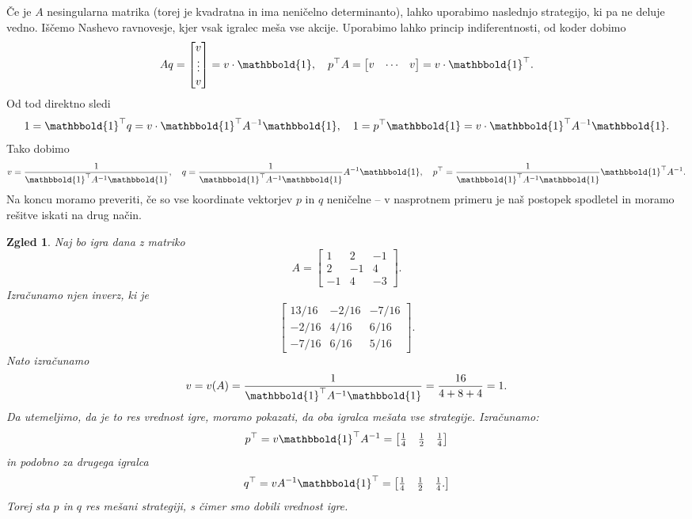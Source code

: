 \documentclass[10pt, a4paper]{article}
\newtheorem{zgled}[izr]{Zgled}
\begin{document}
Če je $A$ nesingularna matrika (torej je kvadratna in ima neničelno determinanto), lahko uporabimo naslednjo strategijo, ki pa ne deluje vedno.
Iščemo Nashevo ravnovesje, kjer vsak igralec meša vse akcije. Uporabimo lahko princip indiferentnosti, od koder dobimo 
$$A q = \begin{bmatrix}
  v \\ \vdots \\ v
\end{bmatrix} = v \cdot \mathbbold{1},\quad p ^\top A = \begin{bmatrix}
  v & \cdots & v
\end{bmatrix} = v \cdot \mathbbold{1}^\top.$$
Od tod direktno sledi 
$$1 = \mathbbold{1}^\top q = v \cdot \mathbbold{1}^\top A^{-1} \mathbbold{1},\quad 1 = p^\top \mathbbold{1} = v \cdot \mathbbold{1}^\top A^{-1} \mathbbold{1}.$$
Tako dobimo 
$$v = \frac{1}{\mathbbold{1}^\top A^{-1} \mathbbold{1}},\quad q = \frac{1}{\mathbbold{1}^\top A^{-1} \mathbbold{1}} A^{-1} \mathbbold{1},\quad p^\top = \frac{1}{\mathbbold{1}^\top A^{-1} \mathbbold{1}} \mathbbold{1}^\top A^{-1}.$$
Na koncu moramo preveriti, če so vse koordinate vektorjev $p$ in $q$ neničelne -- v nasprotnem primeru je naš postopek spodletel in moramo rešitve iskati na drug način.

\begin{zgled}
  Naj bo igra dana z matriko 
  $$A = \begin{bmatrix}
    1 & 2 & -1\\
    2 & -1 & 4\\
    -1 & 4 & -3
  \end{bmatrix}.$$
  Izračunamo njen inverz, ki je 
  $$\begin{bmatrix}
    13/16 & -2/16 & -7/16\\
    -2/16 & 4/16 & 6/16\\
    -7/16 & 6/16 & 5/16
  \end{bmatrix}.$$
  Nato izračunamo 
  $$v = v(A) = \frac{1}{\mathbbold{1}^\top A^{-1} \mathbbold{1}} = \frac{16}{4 + 8 + 4} = 1.$$
  Da utemeljimo, da je to res vrednost igre, moramo pokazati, da oba igralca mešata vse strategije.
  Izračunamo:
  $$p^\top = v \mathbbold{1}^\top A^{-1} = \begin{bmatrix}
    \frac{1}{4} & \frac{1}{2} & \frac{1}{4}
  \end{bmatrix}$$ in podobno za drugega igralca 
  $$q^\top = v A^{-1}\mathbbold{1}^\top  = \begin{bmatrix}
    \frac{1}{4} & \frac{1}{2} & \frac{1}{4}.
  \end{bmatrix}$$
  Torej sta $p$ in $q$ res mešani strategiji, s čimer smo dobili vrednost igre.
\end{zgled}
\end{document}
